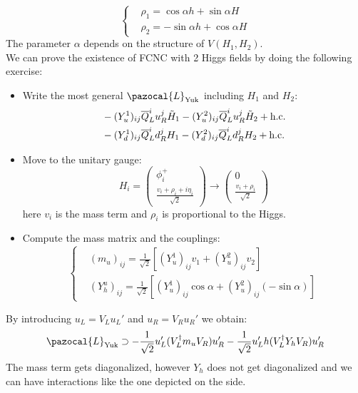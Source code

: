 \documentclass[../main.tex]{subfiles}
\begin{document}
\begin{kaobox}[frametitle=Two Higgs doublet model]
\[
\left\{
\begin{aligned}
&\rho_1=\cos\alpha h+\sin\alpha H\\
&\rho_2=-\sin\alpha h+\cos\alpha H
\end{aligned}
\right.
\]
The parameter $\alpha$ depends on the structure of $V(H_1,H_2)$.\\
We can prove the existence of FCNC with 2 Higgs fields by doing the following exercise:
\begin{itemize}
    \item Write the most general $\pazocal{L}_{\text{Yuk}}$ including $H_1$ and $H_2$:
    \begin{align*}
    &-(Y_u^1)_{ij}\overline{Q}_L^iu_R^j\Tilde{H}_1-(Y_u^2)_{ij}\overline{Q}_L^iu_R^j\Tilde{H}_2+\text{h.c.}\\
    &-(Y_d^1)_{ij}\overline{Q}_L^id_R^jH_1-(Y_d^2)_{ij}\overline{Q}_L^id_R^jH_2+\text{h.c.}
    \end{align*}
    \item Move to the unitary gauge:
    \[
    H_i=\left(\begin{array}{c}
    \phi_i^+\\
    \frac{v_i+\rho_i+i\eta_i}{\sqrt{2}}
    \end{array}\right)
    \xrightarrow[]{}
    \left(\begin{array}{c}
    0\\
    \frac{v_i+\rho_i}{\sqrt{2}}
    \end{array}\right)
    \]
    here $v_i$ is the mass term and $\rho_i$ is proportional to the Higgs.
    \item Compute the mass matrix and the couplings:
    \[
    \left\{
    \begin{aligned}
    &(m_u)_{ij}=\frac{1}{\sqrt{2}}\left[(Y_u^1)_{ij}v_1+(Y_u^2)_{ij}v_2\right]\\
    &(Y_h^u)_{ij}=\frac{1}{\sqrt{2}}\left[(Y_u^1)_{ij}\cos\alpha+(Y_u^2)_{ij}(-\sin\alpha)\right]
    \end{aligned}
    \right.
    \]
\end{itemize}
By introducing $u_L=V_Lu_L'$ and $u_R=V_Ru_R'$ we obtain:
\[
\pazocal{L}_{\text{Yuk}}\supset-\frac{1}{\sqrt{2}}u_L'(V_L^\dagger m_uV_R)u_R'-\frac{1}{\sqrt{2}}u_L'h(V_L^\dagger Y_hV_R)u_R'
\]
The mass term gets diagonalized, however $Y_h$ does not get diagonalized and we can have interactions like the one depicted on the side.
\end{kaobox}
\end{document}
